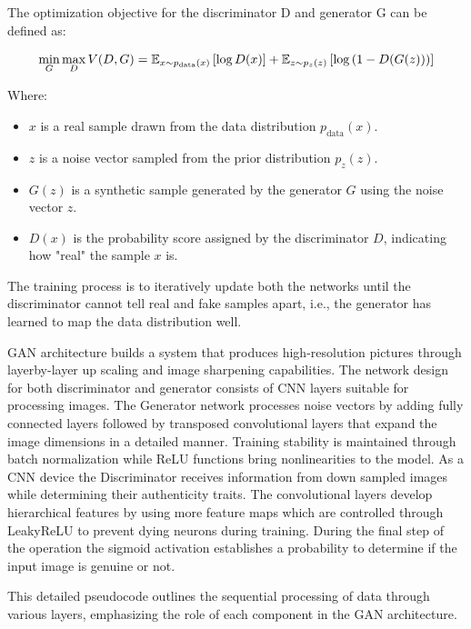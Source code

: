 \documentclass[fleqn,10pt,lineno]{wlpeerj}
\begin{document}
The optimization objective for the discriminator D and generator G can be defined as: 

\begin{equation}
\centering
\min_G \max_D V(D, G) = \mathbb{E}_{x \sim p_{\text{data}}(x)} \left[ \log D(x) \right] + \mathbb{E}_{z \sim p_z(z)} \left[ \log \left(1 - D(G(z)) \right) \right]
\end{equation}

Where:

\begin{itemize}
    \item $x$ is a real sample drawn from the data distribution $p_{\text{data}}(x)$.
    \item $z$ is a noise vector sampled from the prior distribution $p_z(z)$.
    \item $G(z)$ is a synthetic sample generated by the generator $G$ using the noise vector $z$.
    \item $D(x)$ is the probability score assigned by the discriminator $D$, indicating how "real" the sample $x$ is.
\end{itemize}

The training process is to iteratively update both the networks until the discriminator cannot tell real and fake samples apart, i.e., the generator has learned to map the data distribution well.

GAN architecture builds a system that produces high-resolution pictures through layerby-layer up scaling and image sharpening capabilities. The network design for both discriminator and generator consists of CNN layers suitable for processing images. The Generator network processes noise vectors by adding fully connected layers followed by transposed convolutional layers that expand the image dimensions in a detailed manner. Training stability is maintained through batch normalization while ReLU functions bring nonlinearities to the model. As a CNN device the Discriminator receives information from down sampled images while determining their authenticity traits. The convolutional layers develop hierarchical features by using more feature maps which are controlled through LeakyReLU to prevent dying neurons during training. During the final step of the operation the sigmoid activation establishes a probability to determine if the input image is genuine or not. 



This detailed pseudocode outlines the sequential processing of data through various layers, emphasizing the role of each component in the GAN architecture. 
\end{document}
